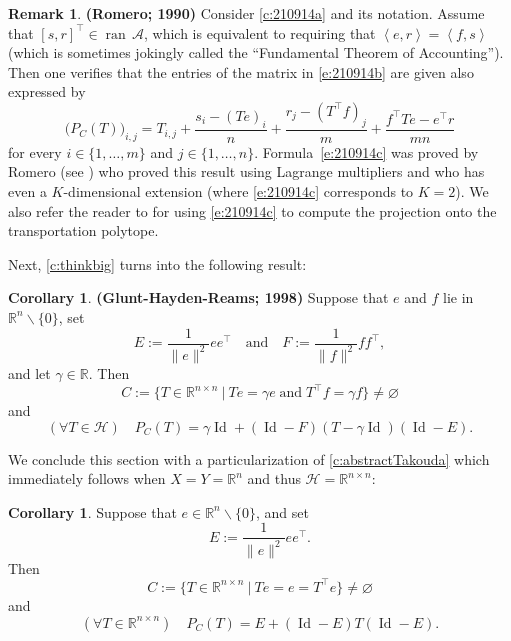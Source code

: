 \documentclass[12pt]{article}
\newcommand{\menge}[2]{\big\{{#1}~\big |~{#2}\big\}}
\newcommand{\scal}[2]{\left\langle{#1},{#2}  \right\rangle}
\newcommand{\RR}{\ensuremath{\mathbb R}}
\newcommand{\ran}{\ensuremath{{\operatorname{ran}}\,}}
\newcommand{\Id}{\ensuremath{\operatorname{Id}}}
\theoremstyle{definition}
\newtheorem{corollary}[theorem]{Corollary}
\newtheorem{remark}[theorem]{Remark}
\providecommand{\RR}{\mathbb{R}}
\providecommand{\ran}{\operatorname{ran}}
\providecommand{\Id}{\operatorname{{ Id}}}
\providecommand{\ran}{\operatorname{ran}}
\providecommand{\Id}{\operatorname{Id}}
\providecommand{\RR}{\mathbb{R}}
\providecommand{\mA}{\mathcal{A}}
\providecommand{\mH}{\mathcal{H}}
\begin{document}
{{ 
\begin{remark}\textbf{(Romero; 1990)}
\label{r:Romero}
Consider \cref{c:210914a} and its notation.
Assume that $[s,r]^\intercal \in\ran \mA$, 
which is equivalent to requiring that 
$\scal{e}{r}=\scal{f}{s}$ 
(which is sometimes jokingly called the ``Fundamental 
Theorem of Accounting''). 
Then one verifies that the entries of the matrix in 
\cref{e:210914b} are given also expressed by 
\begin{equation}
\label{e:210914c}
\big(P_{C}(T)\big)_{i,j} = T_{i,j}
+ \frac{s_i-(Te)_i}{n}
+ \frac{r_j-(T^\intercal f)_j}{m} + \frac{{f^\intercal}{Te}-{e^\intercal}{r}}{mn}
\end{equation}
for every $i\in\{1,\ldots,m\}$ and $j\in\{1,\ldots,n\}$. 
Formula~\cref{e:210914c} was proved by Romero 
(see \cite[Corollary~2.1]{Romero}) who proved this result
using Lagrange multipliers and who has even a $K$-dimensional extension 
(where \cref{e:210914c} corresponds to $K=2$). 
We also refer the reader to \cite{CaRo} for using 
\cref{e:210914c} to compute the projection onto the transportation polytope.
\end{remark}
}

Next, \cref{c:thinkbig} turns into the following result:

\begin{corollary}\textbf{(Glunt-Hayden-Reams; 1998)} 
\cite[Theorem~2.1]{Gluntetal1} \label{c:GHR}
Suppose that $e$ and $f$ lie in $\RR^{n}\smallsetminus\{0\}$, 
set 
\begin{equation}
E:= \frac{1}{\|e\|^{2}}ee^\intercal 
\quad\text{and}\quad
F:= \frac{1}{\|f\|^{2}}ff^\intercal, 
\end{equation}
and let $\gamma\in\RR$. 
Then 
\begin{equation}
C := \menge{T\in\RR^{n\times n}}{Te=\gamma e\;\text{and}\;T^\intercal f=\gamma f}
\neq\varnothing
\end{equation}
and 
\begin{equation}
(\forall T\in\mH)\quad P_C(T) = 
\gamma\Id+(\Id-F)(T-\gamma\Id)(\Id-E). 
\end{equation}
\end{corollary}

We conclude this section with a particularization of \cref{c:abstractTakouda} which immediately follows
when $X=Y=\RR^n$ and thus $\mH = \RR^{n\times n}$: 

\begin{corollary}
\label{c:concreteTakouda}
Suppose that $e\in \RR^n\smallsetminus\{0\}$, 
and set 
\begin{equation}
E:= \frac{1}{\|e\|^{2}}ee^\intercal. 
\end{equation}
Then 
\begin{equation}
C := \menge{T\in\RR^{n\times n}}{Te=e=T^\intercal e}
\neq\varnothing
\end{equation}
and 
\begin{equation}
(\forall T\in\RR^{n\times n})\quad P_C(T) = E+(\Id-E)T(\Id-E). 
\end{equation}
\end{corollary}

}
\end{document}
